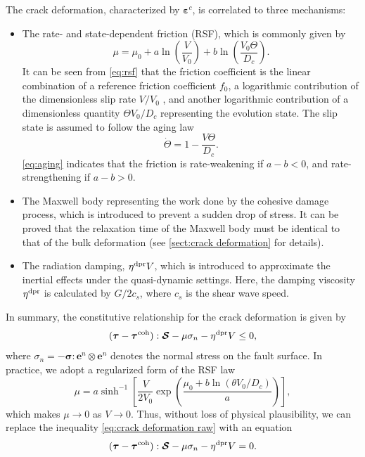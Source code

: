 \documentclass{article}
\begin{document}
The crack deformation, characterized by $\bm\varepsilon^c$, is correlated to three mechanisms:
\begin{itemize}
  \item The rate- and state-dependent friction (RSF), which is commonly given by
    \begin{equation}\label{eq:rsf}
      \mu = \mu_0 + a\ln\left(\frac{V}{V_0}\right) + b\ln\left(\frac{V_0\Theta}{D_c}\right).
    \end{equation}
    It can be seen from \eqref{eq:rsf} that the friction coefficient is the linear combination of a reference friction coefficient $f_0$, a logarithmic contribution of the dimensionless slip rate $V /V_0$ , and another logarithmic contribution of a dimensionless quantity $\Theta V_0 / D_c$ representing the evolution state. The slip state is assumed to follow the aging law
    \begin{equation}\label{eq:aging}
      \dot\Theta = 1 - \frac{V\Theta}{D_c}.
    \end{equation}
    \cref{eq:aging} indicates that the friction is rate-weakening if $a - b < 0$, and rate-strengthening if $a - b > 0$.
  \item The Maxwell body representing the work done by the cohesive damage process, which is introduced to prevent a sudden drop of stress. It can be proved that the relaxation time of the Maxwell body must be identical to that of the bulk deformation (see \cref{sect:crack deformation} for details).
  \item The radiation damping, $\eta^{\rm dpr}V$, which is introduced to approximate the inertial effects under the quasi-dynamic settings. Here, the damping viscosity $\eta^{\rm dpr}$ is calculated by $G / 2c_s$, where $c_s$ is the shear wave speed.
\end{itemize}

In summary, the constitutive relationship for the crack deformation is given by
\begin{equation}\label{eq:crack deformation raw}
  (\bm\tau - \bm\tau^{\rm coh}) : \bm{\mathcal S} - \mu\sigma_n - \eta^{\rm dpr}V \leq 0,
\end{equation}
where $\sigma_n = -\bm\sigma : \bm e^n\otimes\bm e^n$ denotes the normal stress on the fault surface. In practice, we adopt a regularized form of the RSF law
\begin{equation}
  \mu = a\sinh^{-1}\left[\frac{V}{2V_0}\exp\left(\frac{\mu_0 + b\ln(\theta V_0/D_c)}{a}\right)\right],
\end{equation}
which makes $\mu\rightarrow 0$ as $V\rightarrow 0$. Thus, without loss of physical plausibility, we can replace the inequality \eqref{eq:crack deformation raw} with an equation
\begin{equation}\label{eq:crack deformation}
  (\bm\tau - \bm\tau^{\rm coh}) : \bm{\mathcal S} - \mu\sigma_n - \eta^{\rm dpr}V = 0.
\end{equation}
\end{document}
